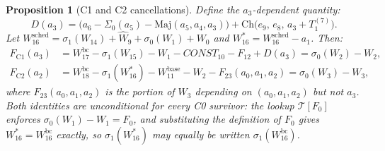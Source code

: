 \documentclass[11pt,a4paper]{article}
\newtheorem{proposition}{Proposition}
\newcommand{\Sig}[1]{\Sigma_{#1}}
\newcommand{\sig}[1]{\sigma_{#1}}
\newcommand{\Maj}{\mathrm{Maj}}
\newcommand{\Ch}{\mathrm{Ch}}
\begin{document}
\begin{proposition}[C1 and C2 cancellations]
\label{prop:c1c2}
Define the $a_3$-dependent quantity:
\[
  D(a_3) = \bigl(a_6 - \Sig{0}(a_5) - \Maj(a_5,a_4,a_3)\bigr)
            + \Ch\!\bigl(e_9,\, e_8,\, a_3 + T_1^{(7)}\bigr).
\]
Let $W_{16}^{\mathrm{sched}} = \sig{1}(W_{14}) + \hat{W}_9 + \sig{0}(W_1) + W_0$
and $W_{16}^* = W_{16}^{\mathrm{sched}} - a_1$.  Then:
\begin{align}
  F_{\mathrm{C1}}(a_3) &= W_{17}^{\mathrm{bc}} - \sig{1}(W_{15})
    - W_1 - \mathit{CONST}_{10} - F_{12} + D(a_3)
    = \sig{0}(W_2) - W_2, \tag{C1-target}\\
  F_{\mathrm{C2}}(a_2) &= W_{18}^{\mathrm{bc}} - \sig{1}(W_{16}^*)
    - W_{11}^{\mathrm{base}} - W_2 - F_{23}(a_0,a_1,a_2)
    = \sig{0}(W_3) - W_3, \tag{C2-target}
\end{align}
where $F_{23}(a_0,a_1,a_2)$ is the portion of $W_3$ depending on
$(a_0,a_1,a_2)$ but not $a_3$.  Both identities are unconditional for every C0 survivor: the lookup $\mathcal{T}[F_0]$ enforces $\sig{0}(W_1)-W_1=F_0$, and substituting the definition of $F_0$ gives $W_{16}^* = W_{16}^{\mathrm{bc}}$ exactly, so $\sig{1}(W_{16}^*)$ may equally be written $\sig{1}(W_{16}^{\mathrm{bc}})$.
\end{proposition}
\end{document}
